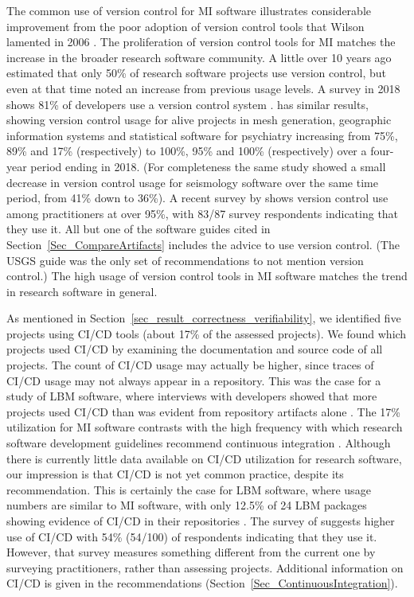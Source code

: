\documentclass[final, 12pt, 3p, times]{elsarticle}
\begin{document}
The common use of version control for MI software illustrates considerable
improvement from the poor adoption of version control tools that Wilson lamented
in 2006 \cite{Wilson2006}.  The proliferation of version control tools for MI
matches the increase in the broader research software community.  A little over
10 years ago \cite{Nguyen-HoanEtAl2010} estimated that only 50\% of research
software projects use version control, but even at that time
\cite{Nguyen-HoanEtAl2010} noted an increase from previous usage levels. A
survey in 2018 shows 81\% of developers use a version control system
\cite{AlNoamanyAndBorghi2018}. \cite{Smith2018} has similar results, showing
version control usage for alive projects in mesh generation, geographic
information systems and statistical software for psychiatry increasing from
75\%, 89\% and 17\% (respectively) to 100\%, 95\% and 100\% (respectively) over
a four-year period ending in 2018. (For completeness the same study showed a
small decrease in version control usage for seismology software over the same
time period, from 41\% down to 36\%).  A recent survey by \cite{CarverEtAl2022}
shows version control use among practitioners at over 95\%, with 83/87 survey
respondents indicating that they use it. All but one of the software guides
cited in Section~\ref{Sec_CompareArtifacts} includes the advice to use version
control. (The USGS guide \cite{USGS2019} was the only set of recommendations to
not mention version control.) The high usage of version control tools in MI
software matches the trend in research software in general.

As mentioned in Section~\ref{sec_result_correctness_verifiability}, we
identified five projects using CI/CD tools (about 17\% of the assessed
projects). We found which projects used CI/CD by examining the documentation and
source code of all projects. The count of CI/CD usage may actually be higher,
since traces of CI/CD usage may not always appear in a repository.  This was the
case for a study of LBM software, where interviews with developers showed that
more projects used CI/CD than was evident from repository artifacts alone
\cite{Michalski2021}.  The 17\% utilization for MI software contrasts with the
high frequency with which research software development guidelines recommend
continuous integration \cite{BrettEtAl2021, Brown2015, ThielEtAl2020,
Zadka2018, vanGompelEtAl2016}. Although there is currently little data available
on CI/CD utilization for research software, our impression is that CI/CD is not
yet common practice, despite its recommendation.  This is certainly the case for
LBM software, where usage numbers are similar to MI software, with only 12.5\%
of 24 LBM packages showing evidence of CI/CD in their repositories
\cite{Michalski2021}.  The survey of \cite{CarverEtAl2022} suggests higher use
of CI/CD with 54\% (54/100) of respondents indicating that they use it. However,
that survey measures something different from the current one by surveying
practitioners, rather than assessing projects.  Additional information on CI/CD
is given in the recommendations (Section~\ref{Sec_ContinuousIntegration}).
\end{document}
